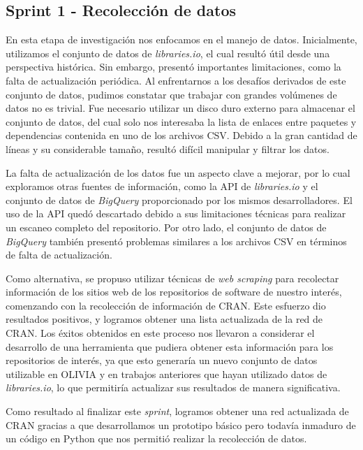 \subsection{Sprint 1 - Recolección de datos}

En esta etapa de investigación nos enfocamos en el manejo de datos. Inicialmente, utilizamos el conjunto de datos 
de \textit{libraries.io}\cite{jeremy_katz_2020_3626071}, el cual resultó útil desde una perspectiva histórica. Sin embargo, presentó importantes 
limitaciones, como la falta de actualización periódica. Al enfrentarnos a los desafíos derivados de este conjunto 
de datos, pudimos constatar que trabajar con grandes volúmenes de datos no es trivial. Fue necesario utilizar un 
disco duro externo para almacenar el conjunto de datos, del cual solo nos interesaba la lista de enlaces entre 
paquetes y dependencias contenida en uno de los archivos CSV. Debido a la gran cantidad de líneas y su considerable 
tamaño, resultó difícil manipular y filtrar los datos.

La falta de actualización de los datos fue un aspecto clave a mejorar, por lo cual exploramos otras fuentes de información, 
como la API de \textit{libraries.io} y el conjunto de datos de \textit{BigQuery} proporcionado por los mismos desarrolladores. 
El uso de la API quedó descartado debido a sus limitaciones técnicas para realizar un escaneo completo del repositorio. 
Por otro lado, el conjunto de datos de \textit{BigQuery} también presentó problemas similares a los archivos CSV en 
términos de falta de actualización.

Como alternativa, se propuso utilizar técnicas de \textit{web scraping} para recolectar información de los sitios web 
de los repositorios de software de nuestro interés, comenzando con la recolección de información de CRAN. Este esfuerzo 
dio resultados positivos, y logramos obtener una lista actualizada de la red de CRAN. Los éxitos obtenidos en este 
proceso nos llevaron a considerar el desarrollo de una herramienta que pudiera obtener esta información para los 
repositorios de interés, ya que esto generaría un nuevo conjunto de datos utilizable en OLIVIA y en trabajos anteriores 
que hayan utilizado datos de \textit{libraries.io}, lo que permitiría actualizar sus resultados de manera significativa.

Como resultado al finalizar este \textit{sprint}, logramos obtener una red actualizada de CRAN gracias a que desarrollamos 
un prototipo básico pero todavía inmaduro de un código en Python que nos permitió realizar la recolección de datos.

